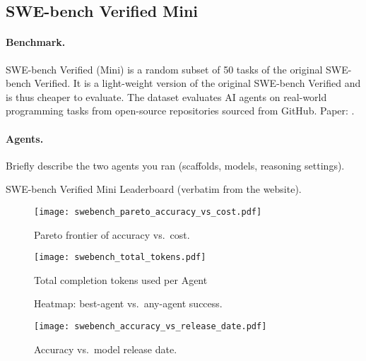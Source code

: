 \subsection{SWE-bench Verified Mini}\label{app:swebench}

\paragraph{Benchmark.}
SWE-bench Verified (Mini) is a random subset of 50 tasks of the original SWE-bench Verified. It is a light-weight version of the original SWE-bench Verified and is thus cheaper to evaluate. The dataset evaluates AI agents on real-world programming tasks from open-source repositories sourced from GitHub.
Paper: \cite{swebench}.

\paragraph{Agents.}
Briefly describe the two agents you ran (scaffolds, models, reasoning settings).


\begin{table}[t]
  \centering
  \caption{SWE-bench Verified Mini Leaderboard (verbatim from the website).}
  \label{tab:swebench_full}
  
\end{table}


\begin{figure}[htbp]
  \centering
  \texttt{[image: swebench\_pareto\_accuracy\_vs\_cost.pdf]}
  \caption{Pareto frontier of accuracy vs.\ cost.}
  \label{fig:swebench_pareto}
\end{figure}

\begin{figure}[htbp]
  \centering
  \texttt{[image: swebench\_total\_tokens.pdf]}
  \caption{Total completion tokens used per Agent}
  \label{fig:swebench_tokens}
\end{figure}

\begin{figure*}[t]
  \centering
  \caption{Heatmap: best-agent vs.\ any-agent success.}
  \label{fig:swebench_heatmap}
\end{figure*}

\begin{figure}[htbp]
  \centering
  \texttt{[image: swebench\_accuracy\_vs\_release\_date.pdf]}
  \caption{Accuracy vs.\ model release date.}
  \label{fig:swebench_release}
\end{figure}

\clearpage